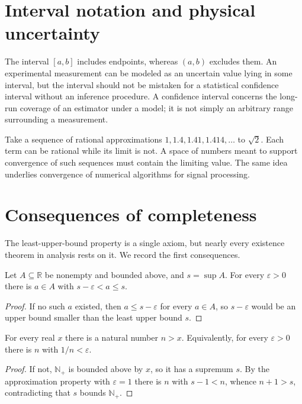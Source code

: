 \section{Interval notation and physical uncertainty}
The interval $[a,b]$ includes endpoints, whereas $(a,b)$ excludes them. An experimental measurement can be modeled as an uncertain value lying in some interval, but the interval should not be mistaken for a statistical confidence interval without an inference procedure. A confidence interval concerns the long-run coverage of an estimator under a model; it is not simply an arbitrary range surrounding a measurement.

\begin{workedexample}
Take a sequence of rational approximations $1,1.4,1.41,1.414,\ldots$ to $\sqrt2$. Each term can be rational while its limit is not. A space of numbers meant to support convergence of such sequences must contain the limiting value. The same idea underlies convergence of numerical algorithms for signal processing.
\end{workedexample}
\section{Consequences of completeness}
The least-upper-bound property is a single axiom, but nearly every existence theorem in analysis rests on it. We record the first consequences.

\begin{proposition}
Let $A\subseteq\mathbb R$ be nonempty and bounded above, and $s=\sup A$. For every $\varepsilon>0$ there is $a\in A$ with $s-\varepsilon<a\le s$.
\end{proposition}
\begin{proof}
If no such $a$ existed, then $a\le s-\varepsilon$ for every $a\in A$, so $s-\varepsilon$ would be an upper bound smaller than the least upper bound $s$.
\end{proof}

\begin{theorem}
For every real $x$ there is a natural number $n>x$. Equivalently, for every $\varepsilon>0$ there is $n$ with $1/n<\varepsilon$.
\end{theorem}
\begin{proof}
If not, $\mathbb N_+$ is bounded above by $x$, so it has a supremum $s$. By the approximation property with $\varepsilon=1$ there is $n$ with $s-1<n$, whence $n+1>s$, contradicting that $s$ bounds $\mathbb N_+$.
\end{proof}

